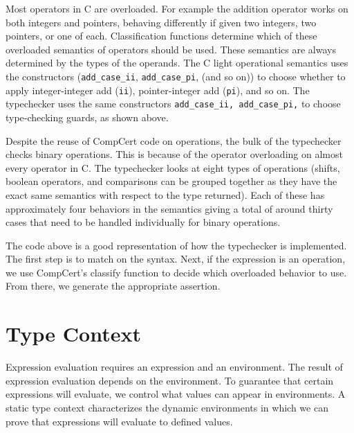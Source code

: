 \documentclass{puthesis}
\begin{document}
Most operators in C are overloaded. For example the addition operator
works on both integers and pointers, behaving differently if given two
integers, two pointers, or one of each. 
Classification functions determine which of these overloaded semantics
of operators should be used. These semantics are always determined by the types
of the operands. 
The C light operational semantics uses
the constructors (\lstinline|add_case_ii|, \lstinline|add_case_pi|, (and so on))
to choose whether to apply integer-integer add (\lstinline|ii|),
pointer-integer add (\lstinline|pi|), and so on.
The typechecker uses the same constructors
\lstinline{add_case_ii, add_case_pi,} to choose
type-checking guards, as shown above.

Despite the reuse of CompCert code on operations, the bulk of the
typechecker checks binary operations. This is because of the operator
overloading on almost every operator in C. The typechecker looks at
eight types of operations (shifts, boolean operators, and comparisons
can be grouped together as they have the exact same semantics with
respect to the type returned). Each of these has approximately four
behaviors in the semantics giving a total of around thirty cases that
need to be handled individually for binary operations.
 
The code above is a good representation of how the typechecker is
implemented. The first step is to match on the syntax. Next, if the expression
is an operation, we use CompCert's classify function to decide which overloaded
behavior to use. From there, we generate the appropriate assertion. 

\section{Type Context}
\label{sec:context}

Expression evaluation requires an expression and an environment.  The
result of expression evaluation depends on the environment. To
guarantee that certain expressions will evaluate, we control what
values can appear in environments. A static type context characterizes
the dynamic environments in which we can prove that expressions will
evaluate to defined values.
\end{document}
